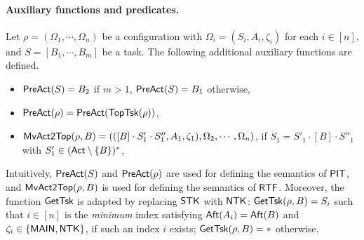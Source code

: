 \paragraph{Auxiliary functions and predicates.} 
Let $\rho = (\Omega_1,\cdots,\Omega_n)$ be a configuration with  $\Omega_i = (S_i, A_i, \zeta_i)$ for each $i\in[n]$, and $S=[B_1,\cdots,B_m]$ be a task. 
The following additional auxiliary functions are defined. 
\begin{itemize}
    \item $\mathsf{PreAct}(S) = B_2$ if $m> 1$, $\mathsf{PreAct}(S) = B_1$ otherwise,

	\item $\mathsf{PreAct}(\rho) = \mathsf{PreAct}(\mathsf{TopTsk}(\rho))$,
	
	\item $\mathsf{MvAct2Top}(\rho, B)  =(([B]\cdot S'_1 \cdot S''_1,A_1,\zeta_1), \Omega_2, \cdots, \Omega_n) $, 
        if $S_1=S'_1 \cdot[B]\cdot S''_1$ with $S'_1 \in ({\sf Act} \setminus \{B\})^*$,


\end{itemize}
Intuitively, $\mathsf{PreAct}(S)$ and $\mathsf{PreAct}(\rho)$ are used for defining the semantics of ${\sf PIT}$, and $\mathsf{MvAct2Top}(\rho, B)$ is used for defining the semantics of ${\sf RTF}$.
Moreover, the function $\mathsf{GetTsk}$ is adapted by replacing ${\sf STK}$ with ${\sf NTK}$: $\mathsf{GetTsk}(\rho, B) = S_i$ such that $i \in [n]$ is the \emph{minimum} index satisfying ${\sf Aft}(A_i)={\sf Aft}(B)$ and $\zeta_i \in \{{\sf MAIN},{\sf NTK}\}$, if such an index $i$ exists; $\mathsf{GetTsk}(\rho, B) = *$ otherwise.


